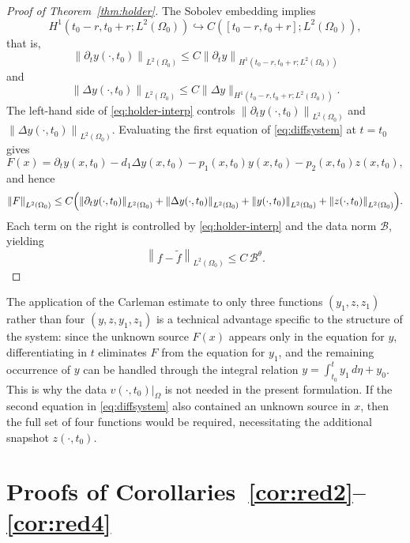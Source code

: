 \documentclass[12pt]{amsart}
\theoremstyle{plain}
\theoremstyle{definition}
\theoremstyle{remark}
\newtheorem{remark}{Remark}[section]
\newcommand{\p}{\partial}
\newcommand{\norm}[1]{\left\lVert#1\right\rVert}
\newcommand{\Om}{\Omega}
\newcommand{\Lap}{\Delta}
\begin{document}
\begin{proof}[Proof of Theorem~\ref{thm:holder}]
The Sobolev embedding implies
$$
H^1(t_0-r,t_0+r;L^2(\Om_0))
\hookrightarrow C([t_0-r,t_0+r];L^2(\Om_0)),
$$
that is, 
$$
\left\|\partial_t y\left(\cdot, t_0\right)\right\|_{L^2\left(\Omega_0\right)} \leq C\left\|\partial_t y\right\|_{H^1\left(t_0-r, t_0+r ; L^2\left(\Omega_0\right)\right)}
$$
and
$$
\left\|\Delta y\left(\cdot, t_0\right)\right\|_{L^2\left(\Omega_0\right)} \leq C\|\Delta y\|_{H^1\left(t_0-r, t_0+r ; L^2\left(\Omega_0\right)\right)}.
$$
The left-hand side of \eqref{eq:holder-interp} controls
$\norm{\p_t y(\cdot,t_0)}_{L^2(\Om_0)}$ and
$\norm{\Lap y(\cdot,t_0)}_{L^2(\Om_0)}$.
Evaluating the first equation of \eqref{eq:diffsystem} at $t=t_0$ gives
\[
F(x)=\p_t y(x,t_0)-d_1\Lap y(x,t_0)-p_1(x,t_0)y(x,t_0)
-p_2(x,t_0)z(x,t_0),
\]
and hence
\[
\norm{F}_{L^2(\Om_0)}\le C\Bigl(
\norm{\p_t y(\cdot,t_0)}_{L^2(\Om_0)}
+\norm{\Lap y(\cdot,t_0)}_{L^2(\Om_0)}
+\norm{y(\cdot,t_0)}_{L^2(\Om_0)}
+\norm{z(\cdot,t_0)}_{L^2(\Om_0)}\Bigr).
\]
Each term on the right is controlled by \eqref{eq:holder-interp} and the
data norm $\mathcal{B}$, yielding
$$\norm{f-\tilde f}_{L^2(\Om_0)}\le C\,\mathcal{B}^\theta.$$
\end{proof}

The application of the Carleman estimate to only three functions $(y_1,z,z_1)$ rather than four $(y,z,y_1,z_1)$ is a technical advantage specific to the structure of the system: since the unknown source $F(x)$ appears only in the equation for $y$, differentiating in $t$ eliminates $F$ from the equation for $y_1$, and the remaining occurrence of $y$ can be handled through the integral relation $y=\int_{t_0}^t y_1\,d\eta+y_0$. This is why the data $v(\cdot,t_0)|_\Om$ is not needed in the present
formulation.
If the second equation in \eqref{eq:diffsystem} also contained an unknown source in $x$, then the full set of four functions would be required, necessitating the additional snapshot $z(\cdot,t_0)$.


\section{Proofs of Corollaries~\ref{cor:red2}--\ref{cor:red4}}
\label{app:reduction}
\end{document}
